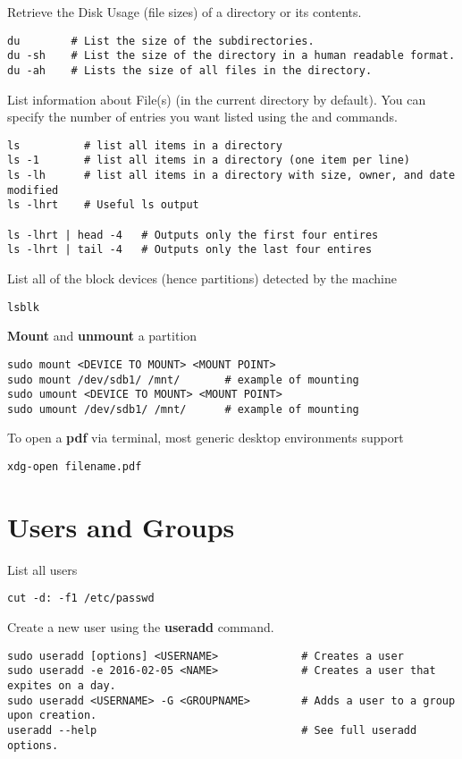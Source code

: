 Retrieve the Disk Usage (file sizes) of a directory or its contents.
\begin{lstlisting}
du        # List the size of the subdirectories.
du -sh    # List the size of the directory in a human readable format.
du -ah    # Lists the size of all files in the directory.
\end{lstlisting}

List information about File(s) (in the current directory by default). You can specify the number of entries you want listed using the  and  commands.
\begin{lstlisting}
ls			# list all items in a directory
ls -1		# list all items in a directory (one item per line)
ls -lh		# list all items in a directory with size, owner, and date modified
ls -lhrt	# Useful ls output

ls -lhrt | head -4	 # Outputs only the first four entires
ls -lhrt | tail -4	 # Outputs only the last four entires
\end{lstlisting}

List all of the block devices (hence partitions) detected by the machine
\begin{lstlisting}
lsblk
\end{lstlisting}

\textbf{Mount} and \textbf{unmount} a partition
\begin{lstlisting}
sudo mount <DEVICE TO MOUNT> <MOUNT POINT>
sudo mount /dev/sdb1/ /mnt/       # example of mounting
sudo umount <DEVICE TO MOUNT> <MOUNT POINT>
sudo umount /dev/sdb1/ /mnt/      # example of mounting
\end{lstlisting}


To open a \textbf{pdf} via terminal, most generic desktop environments support
\begin{lstlisting}
xdg-open filename.pdf
\end{lstlisting}





\section{Users and Groups}

List all users
\begin{lstlisting}
cut -d: -f1 /etc/passwd
\end{lstlisting}

Create a new user using the \textbf{useradd} command.
\begin{lstlisting}
sudo useradd [options] <USERNAME>             # Creates a user
sudo useradd -e 2016-02-05 <NAME>             # Creates a user that expites on a day.
sudo useradd <USERNAME> -G <GROUPNAME>        # Adds a user to a group upon creation.
useradd --help                                # See full useradd options.
\end{lstlisting}

